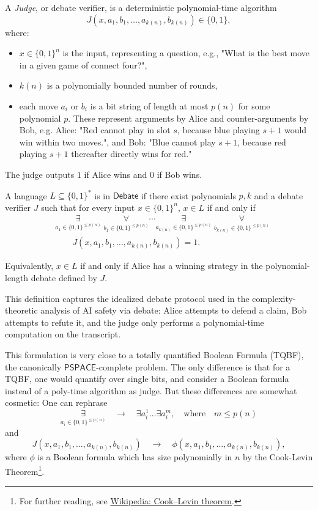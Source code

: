 \documentclass[11pt]{article}
\newcommand{\bigexists}{\mathop{\exists}\limits}
\newcommand{\bigforall}{\mathop{\forall}\limits}
\begin{document}
\begin{definition}[Judge]
A \emph{Judge}, or debate verifier, is a deterministic polynomial-time algorithm
\[
J(x,a_1,b_1,\dots,a_{k(n)}, b_{k(n)}) \in \{0,1\},
\]
where:
\begin{itemize}
    \item \(x \in \{0,1\}^n\) is the input, representing a question, e.g., "What is the best move in a given game of connect four?",
    \item \(k(n)\) is a polynomially bounded number of rounds,
    \item each move \(a_i\) or $b_i$ is a bit string of length at most \(p(n)\) for some polynomial \(p\). These represent arguments by Alice and counter-arguments by Bob, e.g. Alice: "Red cannot play in slot $s$, because blue playing $s+1$ would win within two moves.", and Bob: "Blue cannot play $s+1$, because red playing $s+1$ thereafter directly wins for red."
\end{itemize}
The judge outputs \(1\) if Alice wins and \(0\) if Bob wins.
\end{definition}

\begin{definition}
A language \(L \subseteq \{0,1\}^*\) is in \(\mathsf{Debate}\) if there exist polynomials \(p,k\) and a debate verifier \(J\) such that for every input \(x\in\{0,1\}^n\), \(x \in L\) if and only if
\[
\begin{aligned}
&\bigexists_{a_1 \in \{0,1\}^{\le p(n)}}\;
\bigforall_{b_1 \in \{0,1\}^{\le p(n)}}
\cdots
\bigexists_{a_{k(n)} \in \{0,1\}^{\le p(n)}}\;
\bigforall_{b_{k(n)} \in \{0,1\}^{\le p(n)}} \\
&\qquad J(x,a_1,b_1,\dots,a_{k(n)},b_{k(n)})=1.
\end{aligned}
\]

Equivalently, \(x\in L\) if and only if Alice has a winning strategy in the polynomial-length debate defined by \(J\).
\end{definition}

\begin{remark}
This definition captures the idealized debate protocol used in the complexity-theoretic analysis of AI safety via debate: Alice attempts to defend a claim, Bob attempts to refute it, and the judge only performs a polynomial-time computation on the transcript.
\end{remark}

This formulation is very close to a totally quantified Boolean Formula (TQBF), the canonically $\mathsf{PSPACE}$-complete problem. The only difference is that for a TQBF, one would quantify over single bits, and consider a Boolean formula instead of a poly-time algorithm as judge. But these differences are somewhat cosmetic: One can rephrase
$$
\bigexists_{a_i \in \{0,1\}^{\le p(n)}} \quad\rightarrow\quad \exists a_i^1 \dots \exists a_i^{m}, \quad\text{where}\quad m \le p(n)
$$
and
$$
J(x,a_1,b_1,\dots,a_{k(n)},b_{k(n)}) \quad\rightarrow\quad \phi(x,a_1,b_1,\dots,a_{k(n)},b_{k(n)}),
$$
where $\phi$ is a Boolean formula which has size polynomially in $n$ by the Cook-Levin Theorem\footnote{For further reading, see \href{https://en.wikipedia.org/wiki/Cook–Levin_theorem}{Wikipedia: Cook--Levin theorem}.}.
\end{document}
